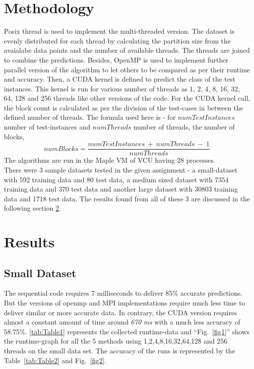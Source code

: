 \documentclass[conference]{IEEEtran}
\begin{document}
\section{Methodology}
Posix thread is used to implement the multi-threaded version. The dataset is evenly distributed for each thread by calculating the partition size from the avaialabe data points and the number of available threads. The threads are joined to combine the predictions. Besides, OpenMP is used to implement further parallel version of the algorithm to let others to be compared as per their runtime and accuracy.
Then, a CUDA kernel is defined to predict the class of the test instances. This kernel is run for various number of threads as 1, 2, 4, 8, 16, 32, 64, 128 and 256 threads like other versions of the code. For the CUDA kernel call, the block count is calculated as per the division of the test-cases in between the defined number of threads. The formula used here is - for $numTestInstances$ number of test-instances and $numThreads$ number of threads, the number of blocks, \[numBlocks=\textstyle\frac{numTestInstances ~ + ~ numThreads ~ - ~ 1}{numThreads} \]
The algorithms are run in the Maple VM of VCU having 28 processes.\\
There were 3 sample datasets tested in the given assignment - a small-dataset with 592 training data and 80 test data, a medium sized dataset with 7354 training data and 370 test data and another large dataset with 30803 training data and 1718 test data. The results found from all of these 3 are discussed in the following section \ref{res}.

\section{Results}\label{res}

\subsection{Small Dataset}
The sequential code requires 7 milliseconds to deliver 85\% accurate predictions. But the versions of openmp and MPI implementations require much less time to deliver similar or more accurate data. In contrary, the CUDA version requires almost a constant amount of time around \textit{670 ms} with a much less accuracy of 58.75\%. 
\ref{tab:Table1} represents the collected runtime-data and ``Fig.~\ref{fig1}'' shows the runtime-graph for all the 5 methods using 1,2,4,8,16,32,64,128 and 256 threads on the small data set. The accuracy of the runs is represented by the Table~\ref{tab:Table2} and Fig.~\ref{fig2}.
\end{document}
